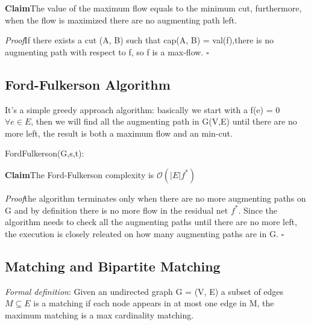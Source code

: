 \documentclass[11pt]{article}
\newenvironment{claim}[1]{\par\textbf{Claim}\space#1}{}
\newenvironment{proof}[1]{\par\textit{Proof}\space#1}{\hfill\ensuremath{\square}}
\begin{document}
\begin{claim}
The value of the maximum flow equals to the minimum cut, furthermore, when the flow is maximized there are no augmenting path left.
\end{claim}\\

\begin{proof}
If there exists a cut (A, B) such that cap(A, B) = val(f),there is no augmenting path with respect to f, so f is a max-flow. 
\end{proof}

\subsection{Ford-Fulkerson Algorithm}
It's a simple greedy approach algorithm: basically we start with a f(e) = 0 $\forall e \in E$, then we will find all the augmenting path in G(V,E) until there are no more left, the result is both a maximum flow and an min-cut.\\

\begin{algorithm}[H]
\SetAlgoLined
\small
{}

\BlankLine
	

\BlankLine

\caption{FordFulkerson(G,s,t):}
\end{algorithm}

\begin{claim}
The Ford-Fulkerson complexity is $\mathcal{O}(|E|f^{*})$ 
\end{claim}\\

\begin{proof}
the algorithm terminates only when there are no more augmenting paths on G and by definition there is no more flow in the residual net $f^{*}$. Since the algorithm needs to check all the augmenting paths until there are no more left, the execution is closely releated on how many augmenting paths are in G.
\end{proof}

\subsection{Matching and Bipartite Matching}

\emph{Formal definition}: Given an undirected graph G = (V, E) a subset of edges $M \subseteq E$ is a matching if each node appears in at most one edge in M, the maximum matching is a max cardinality matching.
\end{document}
